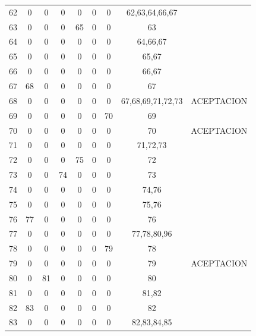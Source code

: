 \begin{longtable}{||c||ccccccc||c||}
62  & 0   & 0  & 0  & 0   & 0   & 0   & 62,63,64,66,67          &             \\
63  & 0   & 0  & 0  & 65  & 0   & 0   & 63                      &             \\
64  & 0   & 0  & 0  & 0   & 0   & 0   & 64,66,67                &             \\
65  & 0   & 0  & 0  & 0   & 0   & 0   & 65,67                   &             \\
66  & 0   & 0  & 0  & 0   & 0   & 0   & 66,67                   &             \\
67  & 68  & 0  & 0  & 0   & 0   & 0   & 67                      &             \\
68  & 0   & 0  & 0  & 0   & 0   & 0   & 67,68,69,71,72,73       & ACEPTACION  \\
69  & 0   & 0  & 0  & 0   & 0   & 70  & 69                      &             \\
70  & 0   & 0  & 0  & 0   & 0   & 0   & 70                      & ACEPTACION  \\
71  & 0   & 0  & 0  & 0   & 0   & 0   & 71,72,73                &             \\
72  & 0   & 0  & 0  & 75  & 0   & 0   & 72                      &             \\
73  & 0   & 0  & 74 & 0   & 0   & 0   & 73                      &             \\
74  & 0   & 0  & 0  & 0   & 0   & 0   & 74,76                   &             \\
75  & 0   & 0  & 0  & 0   & 0   & 0   & 75,76                   &             \\
76  & 77  & 0  & 0  & 0   & 0   & 0   & 76                      &             \\
77  & 0   & 0  & 0  & 0   & 0   & 0   & 77,78,80,96             &             \\
78  & 0   & 0  & 0  & 0   & 0   & 79  & 78                      &             \\
79  & 0   & 0  & 0  & 0   & 0   & 0   & 79                      & ACEPTACION  \\
80  & 0   & 81 & 0  & 0   & 0   & 0   & 80                      &             \\
81  & 0   & 0  & 0  & 0   & 0   & 0   & 81,82                   &             \\
82  & 83  & 0  & 0  & 0   & 0   & 0   & 82                      &             \\
83  & 0   & 0  & 0  & 0   & 0   & 0   & 82,83,84,85             &             \\

\end{longtable}
